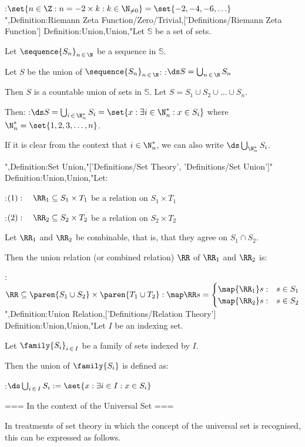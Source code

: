 :$\set {n \in \Z: n = -2 \times k: k \in \N_{\ne 0} } = \set {-2, -4, -6, \ldots}$",Definition:Riemann Zeta Function/Zero/Trivial,['Definitions/Riemann Zeta Function']
Definition:Union,Union,"Let $\mathbb S$ be a set of sets.

Let $\sequence {S_n}_{n \mathop \in \N}$ be a sequence in $\mathbb S$.

Let $S$ be the union of $\sequence {S_n}_{n \mathop \in \N}$:
:$\ds S = \bigcup_{n \mathop \in \N} S_n$


Then $S$ is a countable union of sets in $\mathbb S$.
Let $S = S_1 \cup S_2 \cup \ldots \cup S_n$.

Then:
:$\ds S = \bigcup_{i \mathop \in \N^*_n} S_i = \set {x: \exists i \in \N^*_n: x \in S_i}$
where $\N^*_n = \set {1, 2, 3, \ldots, n}$.


If it is clear from the context that $i \in \N^*_n$, we can also write $\ds \bigcup_{\N^*_n} S_i$.



",Definition:Set Union,"['Definitions/Set Theory', 'Definitions/Set Union']"
Definition:Union,Union,"Let:

:$(1): \quad \RR_1 \subseteq S_1 \times T_1$ be a relation on $S_1 \times T_1$

:$(2): \quad \RR_2 \subseteq S_2 \times T_2$ be a relation on $S_2 \times T_2$

Let $\RR_1$ and $\RR_2$ be combinable, that is, that they agree on $S_1 \cap S_2$.


Then the union relation (or combined relation) $\RR$ of $\RR_1$ and $\RR_2$ is:

:$\RR \subseteq \paren {S_1 \cup S_2} \times \paren {T_1 \cup T_2}: \map \RR s =
\begin{cases}
 \map {\RR_1} s : & s \in S_1 \\
 \map {\RR_2} s : & s \in S_2
\end{cases}$",Definition:Union Relation,['Definitions/Relation Theory']
Definition:Union,Union,"Let $I$ be an indexing set.

Let $\family {S_i}_{i \mathop \in I}$ be a family of sets indexed by $I$.


Then the union of $\family {S_i}$ is defined as:

:$\ds \bigcup_{i \mathop \in I} S_i := \set {x: \exists i \in I: x \in S_i}$


=== In the context of the Universal Set ===

In treatments of set theory in which the concept of the universal set is recognised, this can be expressed as follows.



